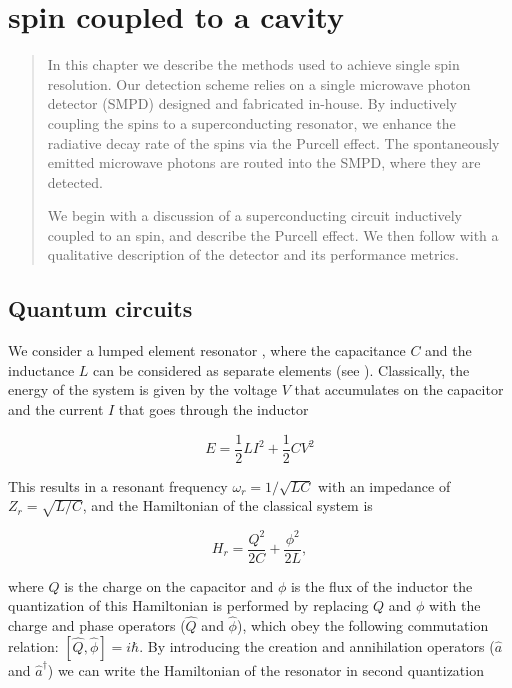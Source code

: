
\setchapterpreamble[u]{\margintoc}
\chapter{\Er spin coupled to a cavity}

\begin{quote}
\itshape

In this chapter we describe the methods used to achieve single spin resolution. 
Our detection scheme relies on a single microwave photon detector (SMPD) designed and fabricated in-house.
By inductively coupling the \Er spins to a superconducting resonator, we enhance the radiative decay rate of the spins via the Purcell effect. The spontaneously emitted microwave photons are routed into the SMPD, where they are detected.

We begin with a discussion of a superconducting circuit inductively coupled to an \Er spin, and describe the Purcell effect. We then follow with a qualitative description of the detector and its performance metrics.

\end{quote}

\section{Quantum circuits}

We consider a lumped element resonator , where the capacitance $C$ and the inductance $L$ can be considered as separate elements (see ). Classically, the energy of the system is given by the voltage $V$ that accumulates on the capacitor and the current $I$ that goes through the inductor 

\begin{equation}
    E = \frac{1}{2}LI^2 + \frac{1}{2}CV^2
\end{equation}

This results in a resonant frequency $\omega_r=1/\sqrt{LC}$ with an impedance of $Z_r = \sqrt{L/C}$, and the Hamiltonian of the classical system is 

\begin{equation}
    H_r =\frac{Q^2}{2C} + \frac{\phi^2}{2L}, 
\end{equation}

where $Q$ is the charge on the capacitor and $\phi$ is the flux of the inductor the quantization of this Hamiltonian is performed by replacing $Q$ and $\phi$ with the charge and phase operators ($\hat{Q}$ and $\hat{\phi}$), which obey the following commutation relation: $[\hat{Q}, \hat{\phi}]=i\hbar$. By introducing the creation and annihilation operators ($\hat{a}$ and $\hat{a}^\dagger$) we can write the Hamiltonian of the resonator in second quantization


